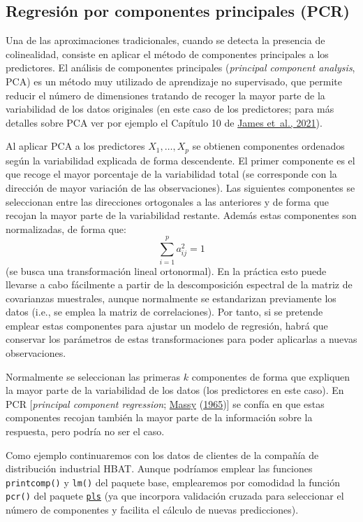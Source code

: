 \documentclass[
  spanish,
]{book}
\theoremstyle{break}
\theoremstyle{definition}
\theoremstyle{definition}
\theoremstyle{definition}
\theoremstyle{definition}
\theoremstyle{remark}
\begin{document}
\hypertarget{regresiuxf3n-por-componentes-principales-pcr}{%
\subsection{Regresión por componentes principales (PCR)}\label{regresiuxf3n-por-componentes-principales-pcr}}

Una de las aproximaciones tradicionales, cuando se detecta la presencia de colinealidad, consiste en aplicar el método de componentes principales a los predictores.
El análisis de componentes principales (\emph{principal component analysis}, PCA) es un método muy utilizado de aprendizaje no supervisado, que permite reducir el número de dimensiones tratando de recoger la mayor parte de la variabilidad de los datos originales (en este caso de los predictores; para más detalles sobre PCA ver por ejemplo el Capítulo 10 de \protect\hyperlink{ref-james2021introduction}{James et~al., 2021}).

Al aplicar PCA a los predictores \(X_1, \ldots, X_p\) se obtienen componentes ordenados según la variabilidad explicada de forma descendente.
El primer componente es el que recoge el mayor porcentaje de la variabilidad total (se corresponde con la dirección de mayor variación de las observaciones).
Las siguientes componentes se seleccionan entre las direcciones ortogonales a las anteriores y de forma que recojan la mayor parte de la variabilidad restante.
Además estas componentes son normalizadas, de forma que:
\[\sum_{i=1}^p a_{ij}^2 = 1\]
(se busca una transformación lineal ortonormal).
En la práctica esto puede llevarse a cabo fácilmente a partir de la descomposición espectral de la matriz de covarianzas muestrales, aunque normalmente se estandarizan previamente los datos (i.e., se emplea la matriz de correlaciones).
Por tanto, si se pretende emplear estas componentes para ajustar un modelo de regresión, habrá que conservar los parámetros de estas transformaciones para poder aplicarlas a nuevas observaciones.

Normalmente se seleccionan las primeras \(k\) componentes de forma que expliquen la mayor parte de la variabilidad de los datos (los predictores en este caso).
En PCR {[}\emph{principal component regression}; \protect\hyperlink{ref-massy1965principal}{Massy} (\protect\hyperlink{ref-massy1965principal}{1965}){]} se confía en que estas componentes recojan también la mayor parte de la información sobre la respuesta, pero podría no ser el caso.

Como ejemplo continuaremos con los datos de clientes de la compañía de distribución industrial HBAT.
Aunque podríamos emplear las funciones \texttt{printcomp()} y \texttt{lm()} del paquete base, emplearemos por comodidad la función \texttt{pcr()} del paquete \href{https://mevik.net/work/software/pls.html}{\texttt{pls}} (ya que incorpora validación cruzada para seleccionar el número de componentes y facilita el cálculo de nuevas predicciones).
\end{document}
